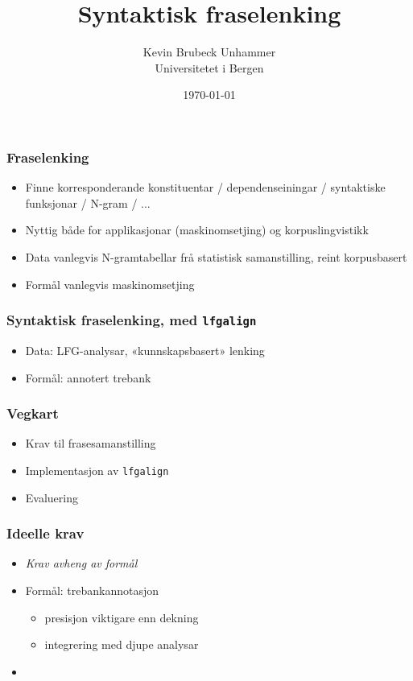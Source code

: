 \documentclass{beamer}
\title{Syntaktisk fraselenking}
\author{Kevin Brubeck Unhammer\\ Universitetet i Bergen}
\date{\today}
\begin{document}
\maketitle

\begin{frame}\frametitle{Fraselenking}
    \begin{itemize}
    \item Finne korresponderande
      konstituentar / dependenseiningar / syntaktiske funksjonar / N-gram / ...
    \item Nyttig både for applikasjonar (maskinomsetjing) og
      korpuslingvistikk
    \item Data vanlegvis N-gramtabellar frå statistisk samanstilling,
      reint korpusbasert
    \item Formål vanlegvis maskinomsetjing
    \end{itemize}
\end{frame}

\begin{frame}\frametitle{Syntaktisk fraselenking, med \texttt{lfgalign}}
  \begin{itemize}
  \item Data: LFG-analysar, «kunnskapsbasert» lenking
  \item Formål: annotert trebank
  \end{itemize}
\end{frame}

\begin{frame}\frametitle{Vegkart}
  \begin{itemize}
  \item Krav til frasesamanstilling
  \item Implementasjon av \texttt{lfgalign}
  \item Evaluering
  \end{itemize}
\end{frame}

\begin{frame}\frametitle{Ideelle krav}
  \begin{itemize}
  \item \emph{Krav avheng av formål}
  \item Formål: trebankannotasjon
    \begin{itemize}
    \item presisjon viktigare enn dekning
    \item integrering med djupe analysar
    \end{itemize}
  \item 
  \end{itemize}
\end{frame}
\end{document}
